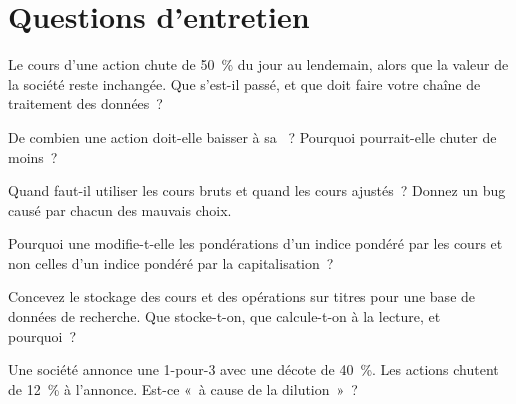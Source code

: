 \section{Questions d'entretien}

\begin{interviewq}\label{iq:m1:shares-corporate-actions-indices:1}
Le cours d'une action chute de 50~\% du jour au lendemain, alors que la valeur de la société reste inchangée.
Que s'est-il passé, et que doit faire votre chaîne de traitement des données~?
\end{interviewq}

\begin{interviewq}\label{iq:m1:shares-corporate-actions-indices:2}
De combien une action doit-elle baisser à sa ~? Pourquoi pourrait-elle
chuter de moins~?
\end{interviewq}

\begin{interviewq}\label{iq:m1:shares-corporate-actions-indices:3}
Quand faut-il utiliser les cours bruts et quand les cours ajustés~? Donnez un bug causé
par chacun des mauvais choix.
\end{interviewq}

\begin{interviewq}\label{iq:m1:shares-corporate-actions-indices:4}
Pourquoi une  modifie-t-elle les pondérations d'un indice pondéré par les cours et non
celles d'un indice pondéré par la capitalisation~?
\end{interviewq}

\begin{interviewq}\label{iq:m1:shares-corporate-actions-indices:5}
Concevez le stockage des cours et des opérations sur titres pour une base de données de recherche.
Que stocke-t-on, que calcule-t-on à la lecture, et pourquoi~?
\end{interviewq}

\begin{interviewq}\label{iq:m1:shares-corporate-actions-indices:6}
Une société annonce une  1-pour-3 avec une décote de 40~\%. Les actions
chutent de 12~\% à l'annonce. Est-ce «~à cause de la dilution~»~?
\end{interviewq}
